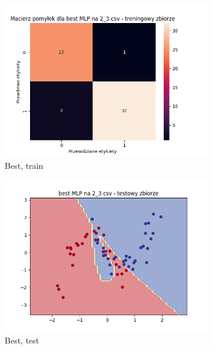 \documentclass[12pt]{article}
\newcommand*{\subfigwidth}{0.24\textwidth}
\begin{document}
\begin{figure}[H]
\begin{subfigure}[t]{\subfigwidth}
        \includegraphics[width=\linewidth]{img/exp_3/mlp/2_3/best/train_matrix.png}
        \caption{Best, train}
    \end{subfigure}
    \hfill
    \begin{subfigure}[t]{\subfigwidth}
        \includegraphics[width=\linewidth]{img/exp_3/mlp/2_3/best/test_boundary.png}
        \caption{Best, test}
    \end{subfigure}
    \hfill
    \begin{subfigure}[t]{\subfigwidth}

\end{subfigure}
\end{figure}
\end{document}
